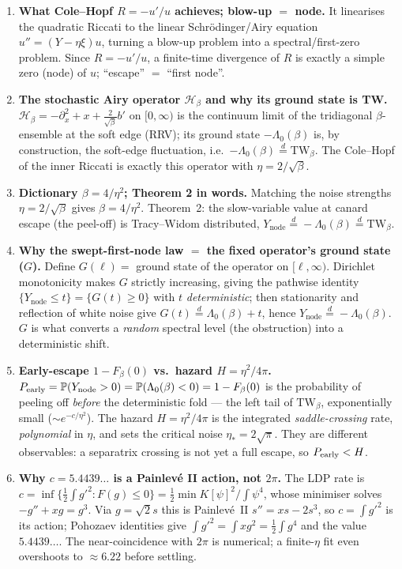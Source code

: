 \documentclass[11pt]{article}
\newcommand{\eqd}{\stackrel{d}{=}}
\newcommand{\TW}{\mathrm{TW}}
\renewcommand{\Pr}{\mathbb{P}}
\newcommand{\Ynode}{Y_{\mathrm{node}}}
\newcommand{\Lam}{\Lambda_0}
\theoremstyle{definition}
\begin{document}
\begin{enumerate}[leftmargin=1.6em,itemsep=0.5em]
\item \textbf{What Cole--Hopf $R=-u'/u$ achieves; blow-up $=$ node.}
It linearises the quadratic Riccati to the linear Schr\"odinger/Airy equation
$u''=(Y-\eta\xi)u$, turning a blow-up problem into a spectral/first-zero problem. Since
$R=-u'/u$, a finite-time divergence of $R$ is exactly a simple zero (node) of $u$; ``escape'' $=$
``first node''.

\item \textbf{The stochastic Airy operator $\mathcal H_\beta$ and why its ground state is TW.}
$\mathcal H_\beta=-\partial_x^2+x+\tfrac{2}{\sqrt\beta}b'$ on $[0,\infty)$ is the continuum limit
of the tridiagonal $\beta$-ensemble at the soft edge (RRV); its ground state $-\Lam(\beta)$ is, by
construction, the soft-edge fluctuation, i.e.\ $-\Lam(\beta)\eqd\TW_\beta$. The Cole--Hopf of the
inner Riccati is exactly this operator with $\eta=2/\sqrt\beta$.

\item \textbf{Dictionary $\beta=4/\eta^2$; Theorem 2 in words.}
Matching the noise strengths $\eta=2/\sqrt\beta$ gives $\beta=4/\eta^2$. Theorem~2: the slow-variable
value at canard escape (the peel-off) is Tracy--Widom distributed, $\Ynode\eqd-\Lam(\beta)\eqd\TW_\beta$.

\item \textbf{Why the swept-first-node law $=$ the fixed operator's ground state ($G$).}
Define $G(\ell)=$ ground state of the operator on $[\ell,\infty)$. Dirichlet monotonicity makes
$G$ strictly increasing, giving the pathwise identity $\{\Ynode\le t\}=\{G(t)\ge0\}$ with $t$
\emph{deterministic}; then stationarity and reflection of white noise give $G(t)\eqd\Lam(\beta)+t$,
hence $\Ynode\eqd-\Lam(\beta)$. $G$ is what converts a \emph{random} spectral level (the
obstruction) into a deterministic shift.

\item \textbf{Early-escape $1-F_\beta(0)$ vs.\ hazard $H=\eta^2/4\pi$.}
$P_{\rm early}=\Pr(\Ynode>0)=\Pr(\Lam(\beta)<0)=1-F_\beta(0)$ is the probability of peeling off
\emph{before} the deterministic fold --- the left tail of $\TW_\beta$, exponentially small
($\sim e^{-c/\eta^2}$). The hazard $H=\eta^2/4\pi$ is the integrated \emph{saddle-crossing} rate,
\emph{polynomial} in $\eta$, and sets the critical noise $\eta_*=2\sqrt\pi$. They are different
observables: a separatrix crossing is not yet a full escape, so $P_{\rm early}<H$.

\item \textbf{Why $c=5.4439\ldots$ is a Painlev\'e II action, not $2\pi$.}
The LDP rate is $c=\inf\{\tfrac12\int g'^2:F(g)\le0\}=\tfrac12\min K[\psi]^2/\!\int\psi^4$, whose
minimiser solves $-g''+xg=g^3$. Via $g=\sqrt2 s$ this is Painlev\'e~II $s''=xs-2s^3$, so $c=\int
g'^2$ is its action; Pohozaev identities give $\int g'^2=\int xg^2=\tfrac12\int g^4$ and the value
$5.4439\ldots$. The near-coincidence with $2\pi$ is numerical; a finite-$\eta$ fit even overshoots
to $\approx6.22$ before settling.


\end{enumerate}
\end{document}
